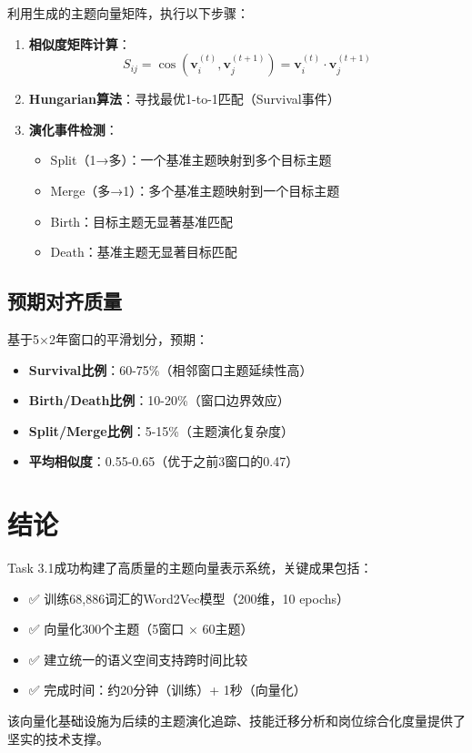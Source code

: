 \documentclass[11pt,a4paper]{article}
\begin{document}
利用生成的主题向量矩阵，执行以下步骤：

\begin{enumerate}
    \item \textbf{相似度矩阵计算}：
    \begin{equation}
    S_{ij} = \cos(\mathbf{v}_i^{(t)}, \mathbf{v}_j^{(t+1)}) = \mathbf{v}_i^{(t)} \cdot \mathbf{v}_j^{(t+1)}
    \end{equation}
    
    \item \textbf{Hungarian算法}：寻找最优1-to-1匹配（Survival事件）
    
    \item \textbf{演化事件检测}：
    \begin{itemize}
        \item Split（1→多）：一个基准主题映射到多个目标主题
        \item Merge（多→1）：多个基准主题映射到一个目标主题
        \item Birth：目标主题无显著基准匹配
        \item Death：基准主题无显著目标匹配
    \end{itemize}
\end{enumerate}

\subsection{预期对齐质量}

基于5×2年窗口的平滑划分，预期：
\begin{itemize}
    \item \textbf{Survival比例}：60-75\%（相邻窗口主题延续性高）
    \item \textbf{Birth/Death比例}：10-20\%（窗口边界效应）
    \item \textbf{Split/Merge比例}：5-15\%（主题演化复杂度）
    \item \textbf{平均相似度}：0.55-0.65（优于之前3窗口的0.47）
\end{itemize}

\section{结论}

Task 3.1成功构建了高质量的主题向量表示系统，关键成果包括：

\begin{itemize}
    \item ✅ 训练68,886词汇的Word2Vec模型（200维，10 epochs）
    \item ✅ 向量化300个主题（5窗口 × 60主题）
    \item ✅ 建立统一的语义空间支持跨时间比较
    \item ✅ 完成时间：约20分钟（训练）+ 1秒（向量化）
\end{itemize}

该向量化基础设施为后续的主题演化追踪、技能迁移分析和岗位综合化度量提供了坚实的技术支撑。
\end{document}
